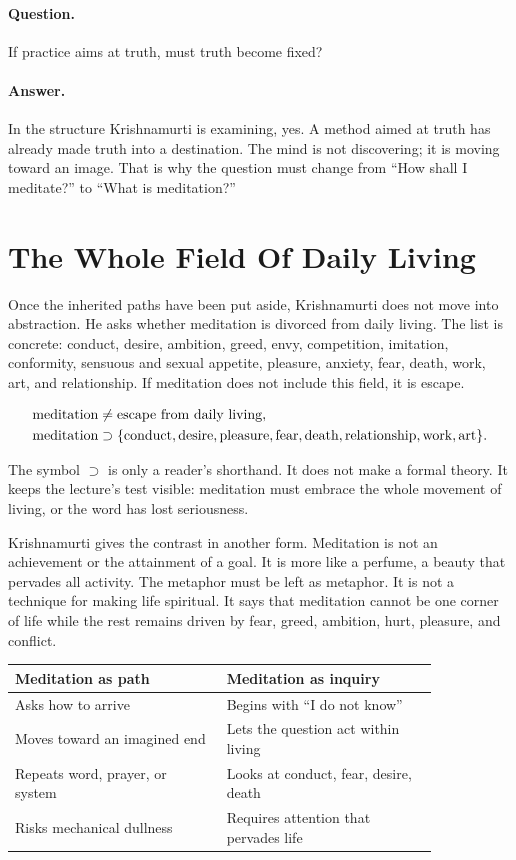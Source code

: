 \documentclass[11pt,oneside]{book}
\begin{document}
\paragraph{Question.}
If practice aims at truth, must truth become fixed?

\paragraph{Answer.}
In the structure Krishnamurti is examining, yes. A method aimed at truth has already made truth into a destination. The mind is not discovering; it is moving toward an image. That is why the question must change from ``How shall I meditate?'' to ``What is meditation?''

\section{The Whole Field Of Daily Living}

Once the inherited paths have been put aside, Krishnamurti does not move into abstraction. He asks whether meditation is divorced from daily living. The list is concrete: conduct, desire, ambition, greed, envy, competition, imitation, conformity, sensuous and sexual appetite, pleasure, anxiety, fear, death, work, art, and relationship. If meditation does not include this field, it is escape.

\begin{align}
\hbox{meditation} &\neq \hbox{escape from daily living},\\
\hbox{meditation} &\supset
\{\hbox{conduct},\hbox{desire},\hbox{pleasure},\hbox{fear},
\hbox{death},\hbox{relationship},\hbox{work},\hbox{art}\}.
\end{align}

The symbol \(\supset\) is only a reader's shorthand. It does not make a formal theory. It keeps the lecture's test visible: meditation must embrace the whole movement of living, or the word has lost seriousness.

Krishnamurti gives the contrast in another form. Meditation is not an achievement or the attainment of a goal. It is more like a perfume, a beauty that pervades all activity. The metaphor must be left as metaphor. It is not a technique for making life spiritual. It says that meditation cannot be one corner of life while the rest remains driven by fear, greed, ambition, hurt, pleasure, and conflict.

\begin{table}
\centering
\begin{tabular}{p{0.42\linewidth}p{0.42\linewidth}}
\hline
Meditation as path & Meditation as inquiry \\
\hline
Asks how to arrive & Begins with ``I do not know'' \\
Moves toward an imagined end & Lets the question act within living \\
Repeats word, prayer, or system & Looks at conduct, fear, desire, death \\
Risks mechanical dullness & Requires attention that pervades life \\
\hline
\end{tabular}
\end{table}
\end{document}
